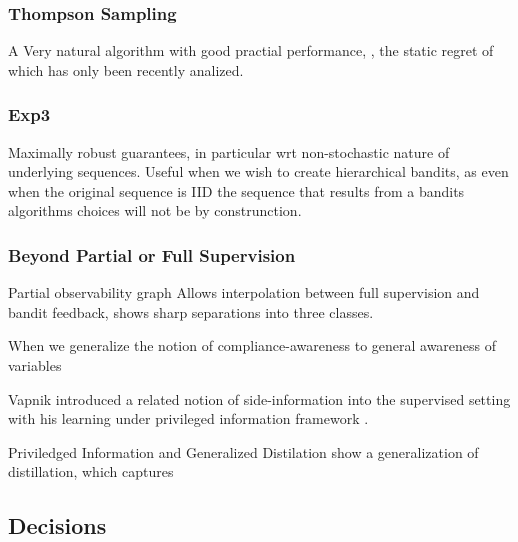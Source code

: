 \subsubsection{Thompson Sampling}

A Very natural algorithm with good practial performance, \cite{thompson:33}, the static regret of which has only been recently analized. 

\subsubsection{Exp3}

Maximally robust guarantees, in particular wrt non-stochastic nature of underlying sequences. Useful when we wish to create hierarchical bandits, as even when the original sequence is IID the sequence that results from a bandits algorithms choices will not be by construnction.




\subsubsection{Beyond Partial or Full Supervision}

Partial observability graph Allows interpolation between full supervision and bandit feedback, shows sharp separations into three classes. 

When we generalize the notion of compliance-awareness to general awareness of variables 

Vapnik introduced a related notion of side-information into the supervised setting with his learning under privileged information framework \cite{vapnik:09}.

Priviledged Information and Generalized Distilation
 \cite{Lopez-Paz16} show a generalization of distillation, which captures 


\subsection{Decisions}

 \cite{othman2010decision}




